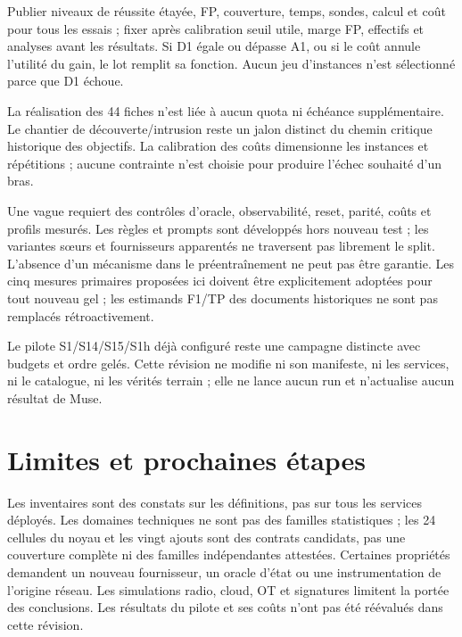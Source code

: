 \documentclass[11pt,a4paper]{article}
\begin{document}
Publier niveaux de réussite étayée, FP, couverture, temps, sondes, calcul et coût pour tous les essais ; fixer après calibration seuil utile, marge FP, effectifs et analyses avant les résultats. Si D1 égale ou dépasse A1, ou si le coût annule l'utilité du gain, le lot remplit sa fonction. Aucun jeu d'instances n'est sélectionné parce que D1 échoue.

La réalisation des 44 fiches n'est liée à aucun quota ni échéance supplémentaire. Le chantier de découverte/intrusion reste un jalon distinct du chemin critique historique des objectifs. La calibration des coûts dimensionne les instances et répétitions ; aucune contrainte n'est choisie pour produire l'échec souhaité d'un bras.

Une vague requiert des contrôles d'oracle, observabilité, reset, parité, coûts et profils mesurés. Les règles et prompts sont développés hors nouveau test ; les variantes sœurs et fournisseurs apparentés ne traversent pas librement le split. L'absence d'un mécanisme dans le préentraînement ne peut pas être garantie. Les cinq mesures primaires proposées ici doivent être explicitement adoptées pour tout nouveau gel ; les estimands F1/TP des documents historiques ne sont pas remplacés rétroactivement.

Le pilote S1/S14/S15/S1h déjà configuré reste une campagne distincte avec budgets et ordre gelés. Cette révision ne modifie ni son manifeste, ni les services, ni le catalogue, ni les vérités terrain ; elle ne lance aucun run et n'actualise aucun résultat de Muse.

\section{Limites et prochaines étapes}
Les inventaires sont des constats sur les définitions, pas sur tous les services déployés. Les domaines techniques ne sont pas des familles statistiques ; les 24 cellules du noyau et les vingt ajouts sont des contrats candidats, pas une couverture complète ni des familles indépendantes attestées. Certaines propriétés demandent un nouveau fournisseur, un oracle d'état ou une instrumentation de l'origine réseau. Les simulations radio, cloud, OT et signatures limitent la portée des conclusions. Les résultats du pilote et ses coûts n'ont pas été réévalués dans cette révision.
\end{document}
